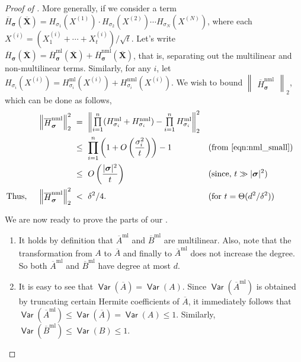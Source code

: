 \documentclass[11pt]{article}
\newcommand{\inparen}[1]{\left ( #1 \right )}
\newcommand{\norm}[2]{\begin{Vmatrix} #2 \end{Vmatrix}_{#1}}
\DeclareMathOperator*{\Var}{\mathsf{Var}}
\newcommand{\bX}{\mathbf{X}}
\newcommand{\bsigma}{{\boldsymbol \sigma}}
\newcommand{\ml}{\mathrm{ml}}
\newcommand{\nml}{\mathrm{nml}}
\begin{document}
\begin{proof}[Proof of ]
	\noindent More generally, if we consider a term $\overline{H}_\bsigma\inparen{\overline{\bX}} = H_{\sigma_1}(X^{(1)}) \cdot H_{\sigma_2}(X^{(2)}) \cdots H_{\sigma_N}(X^{(N)})$, where each $X^{(i)} = \inparen{X^{(i)}_1 + \cdots + X^{(i)}_t}/\sqrt{t}$. Let's write $\overline{H}_\bsigma\inparen{\overline{\bX}} = \overline{H}_\bsigma^{\ml}\inparen{\overline{\bX}} + \overline{H}_\bsigma^{\nml}\inparen{\overline{\bX}}$, that is, separating out the multilinear and non-multilinear terms. Similarly, for any $i$, let $H_{\sigma_i}(X^{(i)}) = H_{\sigma_i}^{\ml}(X^{(i)}) + H_{\sigma_i}^{\nml}(X^{(i)})$. %
	We wish to bound $\norm{2}{\overline{H}_{\bsigma}^{\nml}}$, which can be done as follows,
	\begin{align}
	\norm{2}{\overline{H}_{\bsigma}^{\nml}}^2 &~=~ \norm{2}{\prod\limits_{i=1}^{n}(H_{\sigma_i}^{\ml} + H_{\sigma_i}^{\nml}) - \prod\limits_{i=1}^n H_{\sigma_i}^{\ml}}^2 \nonumber\\
	&~\le~ \prod_{i=1}^n \inparen{1+O\inparen{\frac{\sigma_i^2}{t}}} - 1 && \text{(from \Cref{eqn:nml_small})} \nonumber\\
	&~\le~ O\inparen{\frac{|\bsigma|^2}{t}} && \text{(since, $t \gg |\bsigma|^2$)} \nonumber\\
	\text{Thus, }\quad \norm{2}{\overline{H}_{\bsigma}^{\nml}}^2 &~<~ \delta^2/4. && (\text{for } t = \Theta(d^2/\delta^2))\label{eqn:global_nml_small}
	\end{align}
	
	\noindent We are now ready to prove the parts of our .
	
	\begin{enumerate}
		\item It holds by definition that $\overline{A}^{\ml}$ and $\overline{B}^{\ml}$ are multilinear. Also, note that the transformation from $A$ to $\overline{A}$ and finally to $\overline{A}^{\ml}$ does not increase the degree. So both  $\overline{A}^{\ml}$ and $\overline{B}^{\ml}$ have degree at most $d$.
		
		\item It is easy to see that $\Var(\overline{A}) = \Var(A)$. Since $\Var(\overline{A}^{\ml})$ is obtained by truncating certain Hermite coefficients of $\overline{A}$, it immediately follows that $\Var(\overline{A}^{\ml}) \le \Var(\overline{A}) = \Var(A) \le 1$. Similarly, $\Var(\overline{B}^{\ml}) \le \Var(B) \le 1$.
		

\end{enumerate}
\end{proof}
\end{document}
